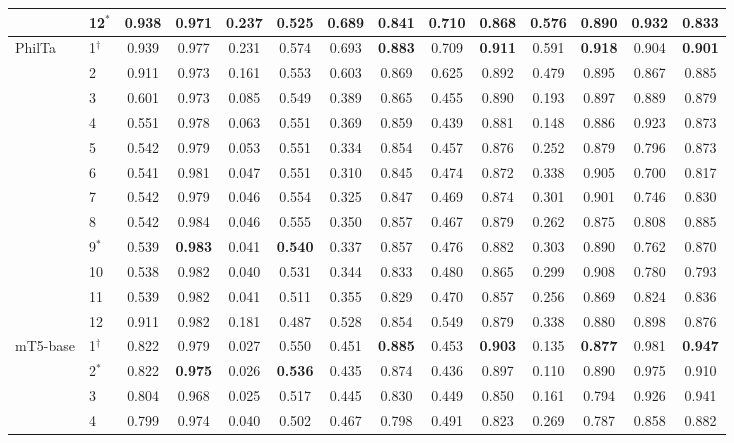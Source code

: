 \begin{table}[t]
\begin{tabular}{llcccccccccccc}
 & 12$^{\ast}$ & 0.938 & \textbf{0.971} & 0.237 & \textbf{0.525} & 0.689 & 0.841 & 0.710 & 0.868 & 0.576 & 0.890 & 0.932 & 0.833 \\
\midrule
PhilTa & 1$^{\dagger}$ & 0.939 & 0.977 & 0.231 & 0.574 & 0.693 & \textbf{0.883} & 0.709 & \textbf{0.911} & 0.591 & \textbf{0.918} & 0.904 & \textbf{0.901} \\
 & 2 & 0.911 & 0.973 & 0.161 & 0.553 & 0.603 & 0.869 & 0.625 & 0.892 & 0.479 & 0.895 & 0.867 & 0.885 \\
 & 3 & 0.601 & 0.973 & 0.085 & 0.549 & 0.389 & 0.865 & 0.455 & 0.890 & 0.193 & 0.897 & 0.889 & 0.879 \\
 & 4 & 0.551 & 0.978 & 0.063 & 0.551 & 0.369 & 0.859 & 0.439 & 0.881 & 0.148 & 0.886 & 0.923 & 0.873 \\
 & 5 & 0.542 & 0.979 & 0.053 & 0.551 & 0.334 & 0.854 & 0.457 & 0.876 & 0.252 & 0.879 & 0.796 & 0.873 \\
 & 6 & 0.541 & 0.981 & 0.047 & 0.551 & 0.310 & 0.845 & 0.474 & 0.872 & 0.338 & 0.905 & 0.700 & 0.817 \\
 & 7 & 0.542 & 0.979 & 0.046 & 0.554 & 0.325 & 0.847 & 0.469 & 0.874 & 0.301 & 0.901 & 0.746 & 0.830 \\
 & 8 & 0.542 & 0.984 & 0.046 & 0.555 & 0.350 & 0.857 & 0.467 & 0.879 & 0.262 & 0.875 & 0.808 & 0.885 \\
 & 9$^{\ast}$ & 0.539 & \textbf{0.983} & 0.041 & \textbf{0.540} & 0.337 & 0.857 & 0.476 & 0.882 & 0.303 & 0.890 & 0.762 & 0.870 \\
 & 10 & 0.538 & 0.982 & 0.040 & 0.531 & 0.344 & 0.833 & 0.480 & 0.865 & 0.299 & 0.908 & 0.780 & 0.793 \\
 & 11 & 0.539 & 0.982 & 0.041 & 0.511 & 0.355 & 0.829 & 0.470 & 0.857 & 0.256 & 0.869 & 0.824 & 0.836 \\
 & 12 & 0.911 & 0.982 & 0.181 & 0.487 & 0.528 & 0.854 & 0.549 & 0.879 & 0.338 & 0.880 & 0.898 & 0.876 \\
\midrule
mT5-base & 1$^{\dagger}$ & 0.822 & 0.979 & 0.027 & 0.550 & 0.451 & \textbf{0.885} & 0.453 & \textbf{0.903} & 0.135 & \textbf{0.877} & 0.981 & \textbf{0.947} \\
 & 2$^{\ast}$ & 0.822 & \textbf{0.975} & 0.026 & \textbf{0.536} & 0.435 & 0.874 & 0.436 & 0.897 & 0.110 & 0.890 & 0.975 & 0.910 \\
 & 3 & 0.804 & 0.968 & 0.025 & 0.517 & 0.445 & 0.830 & 0.449 & 0.850 & 0.161 & 0.794 & 0.926 & 0.941 \\
 & 4 & 0.799 & 0.974 & 0.040 & 0.502 & 0.467 & 0.798 & 0.491 & 0.823 & 0.269 & 0.787 & 0.858 & 0.882 \\

\end{tabular}
\end{table}
